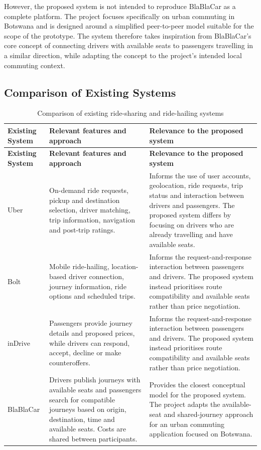 However, the proposed system is not intended to reproduce BlaBlaCar as a complete platform. The project focuses specifically on urban commuting in Botswana and is designed around a simplified peer-to-peer model suitable for the scope of the prototype. The system therefore takes inspiration from BlaBlaCar's core concept of connecting drivers with available seats to passengers travelling in a similar direction, while adapting the concept to the project's intended local commuting context.

\subsection*{Comparison of Existing Systems}

\begin{longtable}{@{}>{\raggedright\arraybackslash}p{}
                   >{\raggedright\arraybackslash}p{}
                   >{\raggedright\arraybackslash}p{}@{}}
\caption{Comparison of existing ride-sharing and ride-hailing systems}\label{tab:comparison}\\
\toprule
\textbf{Existing System} & \textbf{Relevant features and approach} & \textbf{Relevance to the proposed system} \\
\midrule
\endfirsthead
\toprule
\textbf{Existing System} & \textbf{Relevant features and approach} & \textbf{Relevance to the proposed system} \\
\midrule
\endhead
\bottomrule
\endfoot
Uber & On-demand ride requests, pickup and destination selection, driver matching, trip information, navigation and post-trip ratings. & Informs the use of user accounts, geolocation, ride requests, trip status and interaction between drivers and passengers. The proposed system differs by focusing on drivers who are already travelling and have available seats. \\
\addlinespace
Bolt & Mobile ride-hailing, location-based driver connection, journey information, ride options and scheduled trips. & Informs the request-and-response interaction between passengers and drivers. The proposed system instead prioritises route compatibility and available seats rather than price negotiation. \\
\addlinespace
inDrive & Passengers provide journey details and proposed prices, while drivers can respond, accept, decline or make counteroffers. & Informs the request-and-response interaction between passengers and drivers. The proposed system instead prioritises route compatibility and available seats rather than price negotiation. \\
\addlinespace
BlaBlaCar & Drivers publish journeys with available seats and passengers search for compatible journeys based on origin, destination, time and available seats. Costs are shared between participants. & Provides the closest conceptual model for the proposed system. The project adapts the available-seat and shared-journey approach for an urban commuting application focused on Botswana. \\
\end{longtable}

